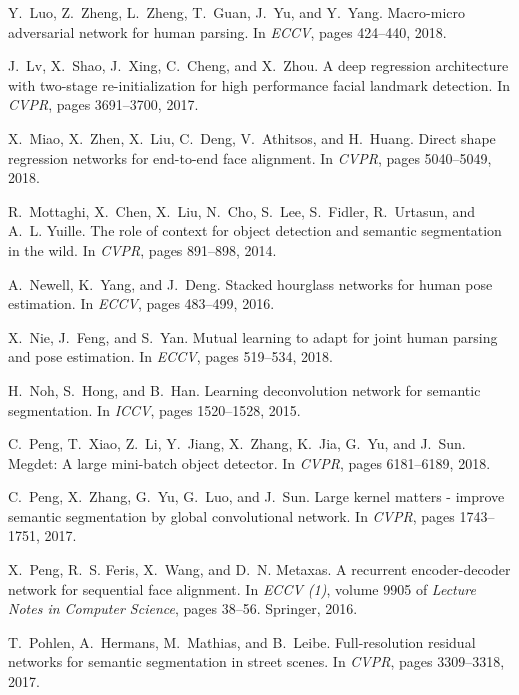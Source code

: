\documentclass[10pt,twocolumn,letterpaper]{article}
\begin{document}
{\begin{thebibliography}{100}
Y.~Luo, Z.~Zheng, L.~Zheng, T.~Guan, J.~Yu, and Y.~Yang.
\newblock Macro-micro adversarial network for human parsing.
\newblock In {\em {ECCV}}, pages 424--440, 2018.

J.~Lv, X.~Shao, J.~Xing, C.~Cheng, and X.~Zhou.
\newblock A deep regression architecture with two-stage re-initialization for
  high performance facial landmark detection.
\newblock In {\em {CVPR}}, pages 3691--3700, 2017.

X.~Miao, X.~Zhen, X.~Liu, C.~Deng, V.~Athitsos, and H.~Huang.
\newblock Direct shape regression networks for end-to-end face alignment.
\newblock In {\em {CVPR}}, pages 5040--5049, 2018.

R.~Mottaghi, X.~Chen, X.~Liu, N.~Cho, S.~Lee, S.~Fidler, R.~Urtasun, and A.~L.
  Yuille.
\newblock The role of context for object detection and semantic segmentation in
  the wild.
\newblock In {\em {CVPR}}, pages 891--898, 2014.

A.~Newell, K.~Yang, and J.~Deng.
\newblock Stacked hourglass networks for human pose estimation.
\newblock In {\em {ECCV}}, pages 483--499, 2016.

X.~Nie, J.~Feng, and S.~Yan.
\newblock Mutual learning to adapt for joint human parsing and pose estimation.
\newblock In {\em {ECCV}}, pages 519--534, 2018.

H.~Noh, S.~Hong, and B.~Han.
\newblock Learning deconvolution network for semantic segmentation.
\newblock In {\em {ICCV}}, pages 1520--1528, 2015.

C.~Peng, T.~Xiao, Z.~Li, Y.~Jiang, X.~Zhang, K.~Jia, G.~Yu, and J.~Sun.
\newblock Megdet: {A} large mini-batch object detector.
\newblock In {\em {CVPR}}, pages 6181--6189, 2018.

C.~Peng, X.~Zhang, G.~Yu, G.~Luo, and J.~Sun.
\newblock Large kernel matters - improve semantic segmentation by global
  convolutional network.
\newblock In {\em {CVPR}}, pages 1743--1751, 2017.

X.~Peng, R.~S. Feris, X.~Wang, and D.~N. Metaxas.
\newblock A recurrent encoder-decoder network for sequential face alignment.
\newblock In {\em {ECCV} {(1)}}, volume 9905 of {\em Lecture Notes in Computer
  Science}, pages 38--56. Springer, 2016.

T.~Pohlen, A.~Hermans, M.~Mathias, and B.~Leibe.
\newblock Full-resolution residual networks for semantic segmentation in street
  scenes.
\newblock In {\em {CVPR}}, pages 3309--3318, 2017.


\end{thebibliography}}
\end{document}
